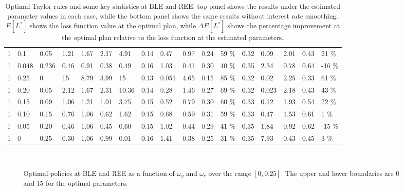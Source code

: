 \begin{table}
\begin{tabular}{lll|ll|ll|lllll|lllll}
 \hline
1 & 0.1 & 0.05 & 1.21 & 1.67 & 2.17 & 4.91 & 0.14 & 0.47 & 0.97 & 0.24 & 59 \% & 0.32 & 0.09 & 2.01 & 0.43 & 21 \% \\
1 & 0.048 & 0.236 & 0.46 & 0.91 & 0.38 & 0.49 & 0.16 & 1.03 & 0.41 & 0.30 & 40 \% & 0.35 & 2.34 & 0.78 & 0.64 &-16 \% \\
\hline
1 & 0.25 & 0 & 15 & 8.79 & 3.99 & 15 & 0.13 & 0.051 & 4.65 & 0.15 & 85 \% & 0.32 & 0.02 & 2.25 & 0.33 & 61 \% \\
1 & 0.20 & 0.05 & 2.12 & 1.67 & 2.31 & 10.36 & 0.14 & 0.28 & 1.46 & 0.27 & 69 \% & 0.32 & 0.023 & 2.18 & 0.43 & 43 \% \\
1 & 0.15 & 0.09 & 1.06 & 1.21 & 1.01 & 3.75 & 0.15 & 0.52 & 0.79 & 0.30 & 60 \% & 0.33 & 0.12 & 1.93 & 0.54 & 22 \% \\
1 & 0.10 & 0.15 & 0.76 & 1.06 & 0.62 & 1.62 & 0.15 & 0.68 & 0.59 & 0.31 & 59 \%  & 0.33 & 0.47 & 1.53 & 0.61 & 1 \% \\
1 & 0.05 & 0.20 & 0.46 & 1.06 & 0.45 & 0.60 & 0.15 & 1.02 & 0.44 & 0.29 & 41 \% & 0.35 & 1.84 & 0.92 & 0.62 &-15 \% \\
1 & 0 & 0.25 & 0.30 & 1.06 & 0.99 & 0.01 & 0.16 & 1.41 & 0.38 & 0.25 & 31 \% & 0.35 & 7.93 & 0.43 & 0.45 & 3 \%
\end{tabular}
 \caption{\label{optpolicy_table} Optimal Taylor rules and some key statistics at BLE and REE: top panel shows the results under the estimated parameter values in each case, while the bottom panel shows the same results without interest rate smoothing. $E[L^{*}]$ shows the loss function value at the optimal plan, while $\Delta E[L^{*}]$ shows the percentage improvement at the optimal plan relative to the loss function at the estimated parameters.  }

\end{table}


\begin{figure}[!h]
  \begin{center}
 
    
    \\
    \end{center}
 \caption{\label{optpolicy_est_figures}  Optimal policies at BLE and REE as a function of  $\omega_y$ and $\omega_r$ over the range $[0, 0.25]$. The upper and lower boundaries are 0 and 15 for the optimal parameters.}
    
\end{figure}


